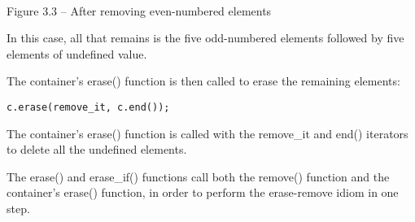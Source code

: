 \hspace*{\fill} \\ %
\begin{center}
	
Figure 3.3 – After removing even-numbered elements
\end{center}

In this case, all that remains is the five odd-numbered elements followed by five elements of undefined value.

The container's erase() function is then called to erase the remaining elements:

\begin{lstlisting}[style=styleCXX]
c.erase(remove_it, c.end());
\end{lstlisting}

The container's erase() function is called with the remove\_it and end() iterators to delete all the undefined elements.

The erase() and erase\_if() functions call both the remove() function and the container's erase() function, in order to perform the erase-remove idiom in one step.




